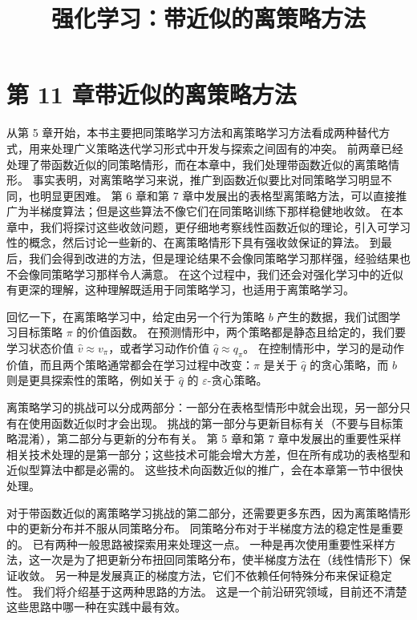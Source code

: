 \documentclass[UTF8, 12pt, fontset=fandol, oneside]{ctexart}
\title{强化学习：带近似的离策略方法}
\author{}
\date{}
\begin{document}
\maketitle

\section*{第 11 章\quad 带近似的离策略方法}

从第 5 章开始，本书主要把同策略学习方法和离策略学习方法看成两种替代方式，用来处理广义策略迭代学习形式中开发与探索之间固有的冲突。
前两章已经处理了带函数近似的同策略情形，而在本章中，我们处理带函数近似的离策略情形。
事实表明，对离策略学习来说，推广到函数近似要比对同策略学习明显不同，也明显更困难。
第 6 章和第 7 章中发展出的表格型离策略方法，可以直接推广为半梯度算法；但是这些算法不像它们在同策略训练下那样稳健地收敛。
在本章中，我们将探讨这些收敛问题，更仔细地考察线性函数近似的理论，引入可学习性的概念，然后讨论一些新的、在离策略情形下具有强收敛保证的算法。
到最后，我们会得到改进的方法，但是理论结果不会像同策略学习那样强，经验结果也不会像同策略学习那样令人满意。
在这个过程中，我们还会对强化学习中的近似有更深的理解，这种理解既适用于同策略学习，也适用于离策略学习。

回忆一下，在离策略学习中，给定由另一个行为策略 $b$ 产生的数据，我们试图学习目标策略 $\pi$ 的价值函数。
在预测情形中，两个策略都是静态且给定的，我们要学习状态价值 $\hat v\approx v_\pi$，或者学习动作价值 $\hat q\approx q_\pi$。
在控制情形中，学习的是动作价值，而且两个策略通常都会在学习过程中改变：$\pi$ 是关于 $\hat q$ 的贪心策略，而 $b$ 则是更具探索性的策略，例如关于 $\hat q$ 的 $\varepsilon$-贪心策略。

离策略学习的挑战可以分成两部分：一部分在表格型情形中就会出现，另一部分只有在使用函数近似时才会出现。
挑战的第一部分与更新目标有关（不要与目标策略混淆），第二部分与更新的分布有关。
第 5 章和第 7 章中发展出的重要性采样相关技术处理的是第一部分；这些技术可能会增大方差，但在所有成功的表格型和近似型算法中都是必需的。
这些技术向函数近似的推广，会在本章第一节中很快处理。

对于带函数近似的离策略学习挑战的第二部分，还需要更多东西，因为离策略情形中的更新分布并不服从同策略分布。
同策略分布对于半梯度方法的稳定性是重要的。
已有两种一般思路被探索用来处理这一点。
一种是再次使用重要性采样方法，这一次是为了把更新分布扭回同策略分布，使半梯度方法在（线性情形下）保证收敛。
另一种是发展真正的梯度方法，它们不依赖任何特殊分布来保证稳定性。
我们将介绍基于这两种思路的方法。
这是一个前沿研究领域，目前还不清楚这些思路中哪一种在实践中最有效。
\end{document}
